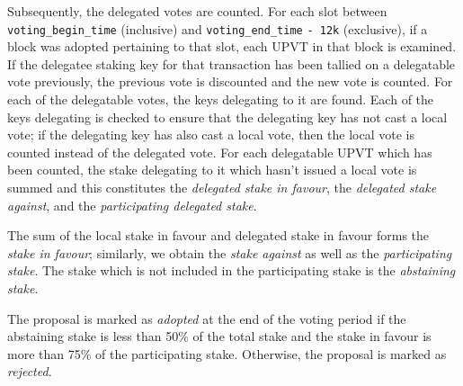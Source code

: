 Subsequently, the delegated votes are counted. For each slot between \verb;voting_begin_time; (inclusive) and \verb;voting_end_time; \verb;- 12k; (exclusive), if a block was adopted pertaining to that slot, each UPVT in that block is examined. If the delegatee staking key for that transaction has been tallied on a delegatable vote previously, the previous vote is discounted and the new vote is counted. For each of the delegatable votes, the keys delegating to it are found. Each of the keys delegating is checked to ensure that the delegating key has not cast a local vote; if the delegating key has also cast a local vote, then the local vote is counted instead of the delegated vote. For each delegatable UPVT which has been counted, the stake delegating to it which hasn't issued a local vote is summed and this constitutes the \emph{delegated stake in favour}, the \emph{delegated stake against}, and the \emph{participating delegated stake}.

The sum of the local stake in favour and delegated stake in favour forms the \emph{stake in favour}; similarly, we obtain the \emph{stake against} as well as the \emph{participating stake}. The stake which is not included in the participating stake is the \emph{abstaining stake}.

The proposal is marked as \emph{adopted} at the end of the voting period if the abstaining stake is less than 50\% of the total stake and the stake in favour is more than 75\% of the participating stake. Otherwise, the proposal is marked as \emph{rejected}.

